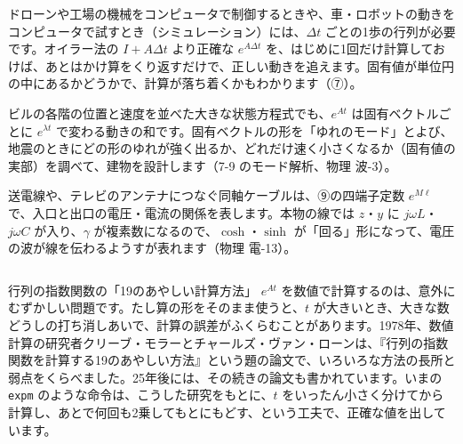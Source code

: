 \begin{butsuri}
\noindent\begin{minipage}[c]{0.68\linewidth}
\raggedright
ドローンや工場の機械をコンピュータで制御するときや、車・ロボットの動きをコンピュータで試すとき（シミュレーション）には、$\Delta t$ ごとの1歩の行列が必要です。オイラー法の $I+A\Delta t$ より正確な $e^{A\Delta t}$ を、はじめに1回だけ計算しておけば、あとはかけ算をくり返すだけで、正しい動きを追えます。固有値が単位円の中にあるかどうかで、計算が落ち着くかもわかります（⑦）。
\end{minipage}\hfill
\begin{minipage}[c]{0.28\linewidth}
\centering
{}
\end{minipage}
\par\vspace{4pt}
ビルの各階の位置と速度を並べた大きな状態方程式でも、$e^{At}$ は固有ベクトルごとに $e^{\lambda t}$ で変わる動きの和です。固有ベクトルの形を「ゆれのモード」とよび、地震のときにどの形のゆれが強く出るか、どれだけ速く小さくなるか（固有値の実部）を調べて、建物を設計します（7-9 のモード解析、物理 波-3）。
\par\vspace{4pt}
送電線や、テレビのアンテナにつなぐ同軸ケーブルは、⑨の四端子定数 $e^{M\ell}$ で、入口と出口の電圧・電流の関係を表します。本物の線では $z$・$y$ に $j\omega L$・$j\omega C$ が入り、$\gamma$ が複素数になるので、$\cosh$・$\sinh$ が「回る」形になって、電圧の波が線を伝わるようすが表れます（物理 電-13）。
\end{butsuri}

\begin{column}{行列の指数関数の「19のあやしい計算方法」}
$e^{At}$ を数値で計算するのは、意外にむずかしい問題です。たし算の形をそのまま使うと、$t$ が大きいとき、大きな数どうしの打ち消しあいで、計算の誤差がふくらむことがあります。1978年、数値計算の研究者クリーブ・モラーとチャールズ・ヴァン・ローンは、『行列の指数関数を計算する19のあやしい方法』という題の論文で、いろいろな方法の長所と弱点をくらべました。25年後には、その続きの論文も書かれています。いまの \texttt{expm} のような命令は、こうした研究をもとに、$t$ をいったん小さく分けてから計算し、あとで何回も2乗してもとにもどす、という工夫で、正確な値を出しています。
\end{column}

